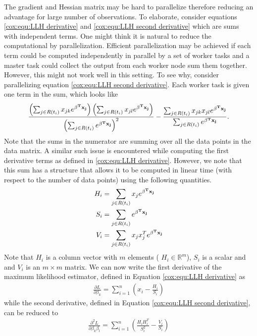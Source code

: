 \documentclass[12pt]{article}
\newcounter{count}
\begin{document}
The gradient and Hessian matrix may be hard to parallelize therefore reducing an advantage for large number of observations. To elaborate, consider equations  \ref{cox:equ:LLH derivative} and \ref{cox:equ:LLH second derivative} which are sums with independent terms. One might think it is natural to reduce the computational by parallelization. Efficient parallelization may be achieved if each term could be computed independently in parallel by a set of worker tasks and a master task could collect the output from each worker node sum them together. However, this might not work well in this setting. To see why, consider parallelizing equation \ref{cox:equ:LLH second derivative}.  Each worker task is given one term in the sum, which looks like
\begin{equation}
 \frac{\left(  \sum_{j \in R(t_i)} x_{jk} e^{\bold{\beta^T x _j} } \right) \left(  \sum_{j \in R(t_i)} x_{jl} e^{\bold{\beta^T x _j} } \right)}{\left( \sum_{j \in R(t_i)} e^{\bold{\beta^T x_j} } \right)^2 }   -  \frac{  \sum_{j \in R(t_i)} x_{jk}x_{jl} e^{\bold{\beta^T x_j} } }{\sum_{j \in R(t_i)} e^{\bold{\beta^T x_j} } }.  
\end{equation}
Note that the sums in the numerator are summing over all the data points in the data matrix. A similar such issue is encountered while computing the first derivative terms as defined in \ref{cox:equ:LLH derivative}. However, we note that this sum has a structure that allows it to be computed in linear time (with respect to the number of data points) using the following quantities.
\begin{align}
H_{i} &=   \sum_{j \in R(t_i)} x_{j} e^{\bold{\beta^T x_j}}\\
S_{i}&=   \sum_{j \in R(t_i)} e^{\bold{\beta^T x_j}} \\
V_{i}&=   \sum_{j \in R(t_i)} x_{j}x_{j}^T e^{\bold{\beta^T x_j} }
\end{align}
Note that $H_{i}$ is a column vector with $m$ elements ( $H_{i}\in \mathbb{R}^m$), $S_{i}$ is a scalar and and $V_{i}$ is an $m \times m$ matrix.
We can now write the first derivative of the maximum likelihood estimator, defined in Equation \ref{cox:equ:LLH derivative} as
\begin{align}
\frac{\partial L}{\partial \beta_k} = \sum_{i = 1}^n \left( x_{i} - \frac{H_{i} }{ S_{i}}  \right)
\end{align}
while the second derivative, defined in Equation \ref{cox:equ:LLH second derivative}, can be reduced to
\begin{align}
\frac{\partial^2 L}{\partial \beta_k \beta_l} = \sum_{i = 1}^n \left( \frac{H_{i}H_{i}^T }{ S_{i}^2 } -  \frac{V_{i}}{ S_{i} } \right) 
\end{align}
\end{document}

